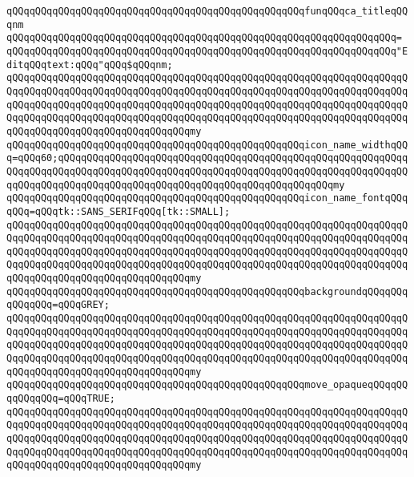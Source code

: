 \verb|qQQqqQQqqQQqqQQqqQQqqQQqqQQqqQQqqQQqqQQqqQQqqQQqqQQqfunqQQqca_titleqQQqnm|\newline
\verb|qQQqqQQqqQQqqQQqqQQqqQQqqQQqqQQqqQQqqQQqqQQqqQQqqQQqqQQqqQQqqQQqqQQq=|\newline
\verb|qQQqqQQqqQQqqQQqqQQqqQQqqQQqqQQqqQQqqQQqqQQqqQQqqQQqqQQqqQQqqQQqqQQq"EditqQQqtext:qQQq"qQQq$qQQqnm;|\newline
\verb|qQQqqQQqqQQqqQQqqQQqqQQqqQQqqQQqqQQqqQQqqQQqqQQqqQQqqQQqqQQqqQQqqQQqqQQqqQQqqQQqqQQqqQQqqQQqqQQqqQQqqQQqqQQqqQQqqQQqqQQqqQQqqQQqqQQqqQQqqQQqqQQqqQQqqQQqqQQqqQQqqQQqqQQqqQQqqQQqqQQqqQQqqQQqqQQqqQQqqQQqqQQqqQQqqQQqqQQqqQQqqQQqqQQqqQQqqQQqqQQqqQQqqQQqqQQqqQQqqQQqqQQqqQQqqQQqqQQqqQQqqQQqqQQqqQQqqQQqqQQqqQQqqQQqqQQqmy|\newline
\verb|qQQqqQQqqQQqqQQqqQQqqQQqqQQqqQQqqQQqqQQqqQQqqQQqqQQqicon_name_widthqQQq=qQQq60;qQQqqQQqqQQqqQQqqQQqqQQqqQQqqQQqqQQqqQQqqQQqqQQqqQQqqQQqqQQqqQQqqQQqqQQqqQQqqQQqqQQqqQQqqQQqqQQqqQQqqQQqqQQqqQQqqQQqqQQqqQQqqQQqqQQqqQQqqQQqqQQqqQQqqQQqqQQqqQQqqQQqqQQqqQQqqQQqqQQqqQQqqQQqmy|\newline
\verb|qQQqqQQqqQQqqQQqqQQqqQQqqQQqqQQqqQQqqQQqqQQqqQQqqQQqicon_name_fontqQQqqQQq=qQQqtk::SANS_SERIFqQQq[tk::SMALL];|\newline
\verb|qQQqqQQqqQQqqQQqqQQqqQQqqQQqqQQqqQQqqQQqqQQqqQQqqQQqqQQqqQQqqQQqqQQqqQQqqQQqqQQqqQQqqQQqqQQqqQQqqQQqqQQqqQQqqQQqqQQqqQQqqQQqqQQqqQQqqQQqqQQqqQQqqQQqqQQqqQQqqQQqqQQqqQQqqQQqqQQqqQQqqQQqqQQqqQQqqQQqqQQqqQQqqQQqqQQqqQQqqQQqqQQqqQQqqQQqqQQqqQQqqQQqqQQqqQQqqQQqqQQqqQQqqQQqqQQqqQQqqQQqqQQqqQQqqQQqqQQqqQQqqQQqqQQqqQQqmy|\newline
\verb|qQQqqQQqqQQqqQQqqQQqqQQqqQQqqQQqqQQqqQQqqQQqqQQqqQQqbackgroundqQQqqQQqqQQqqQQq=qQQqGREY;|\newline
\verb|qQQqqQQqqQQqqQQqqQQqqQQqqQQqqQQqqQQqqQQqqQQqqQQqqQQqqQQqqQQqqQQqqQQqqQQqqQQqqQQqqQQqqQQqqQQqqQQqqQQqqQQqqQQqqQQqqQQqqQQqqQQqqQQqqQQqqQQqqQQqqQQqqQQqqQQqqQQqqQQqqQQqqQQqqQQqqQQqqQQqqQQqqQQqqQQqqQQqqQQqqQQqqQQqqQQqqQQqqQQqqQQqqQQqqQQqqQQqqQQqqQQqqQQqqQQqqQQqqQQqqQQqqQQqqQQqqQQqqQQqqQQqqQQqqQQqqQQqqQQqqQQqqQQqqQQqmy|\newline
\verb|qQQqqQQqqQQqqQQqqQQqqQQqqQQqqQQqqQQqqQQqqQQqqQQqqQQqmove_opaqueqQQqqQQqqQQqqQQq=qQQqTRUE;|\newline
\verb|qQQqqQQqqQQqqQQqqQQqqQQqqQQqqQQqqQQqqQQqqQQqqQQqqQQqqQQqqQQqqQQqqQQqqQQqqQQqqQQqqQQqqQQqqQQqqQQqqQQqqQQqqQQqqQQqqQQqqQQqqQQqqQQqqQQqqQQqqQQqqQQqqQQqqQQqqQQqqQQqqQQqqQQqqQQqqQQqqQQqqQQqqQQqqQQqqQQqqQQqqQQqqQQqqQQqqQQqqQQqqQQqqQQqqQQqqQQqqQQqqQQqqQQqqQQqqQQqqQQqqQQqqQQqqQQqqQQqqQQqqQQqqQQqqQQqqQQqqQQqqQQqqQQqqQQqmy|\newline
